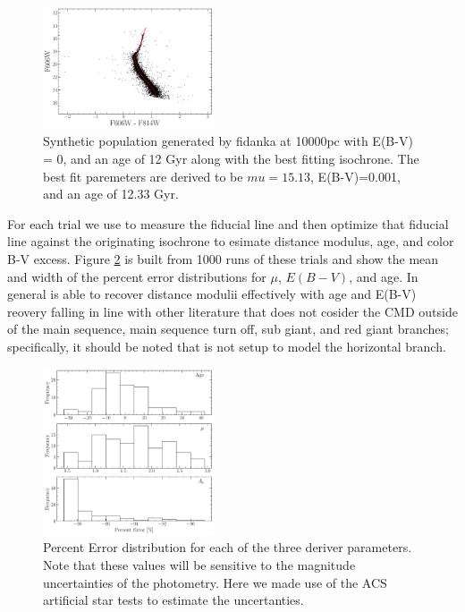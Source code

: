 \begin{figure}
  \centering
  \includegraphics[width=0.45\textwidth]{ExtractedIsoFit.pdf}
  \caption{Synthetic population generated by fidanka at 10000pc with E(B-V) =
  0, and an age of 12 Gyr along with the best fitting isochrone. The best fit
  paremeters are derived to be $mu=15.13$, E(B-V)=0.001, and an age of 12.33
  Gyr.}
  \label{fig:ValidationBestFit}
\end{figure}

For each trial we use \fidanka to measure the fiducial line and then optimize
that fiducial line against the originating isochrone to esimate distance
modulus, age, and color B-V excess. Figure \ref{fig:validationDist} is built
from 1000 runs of these trials and show the mean and width of the percent error
distributions for $\mu$, $E(B-V)$, and age. In general \fidanka is able to
recover distance modulii effectively with age and E(B-V) reovery falling in
line with other literature that does not cosider the CMD outside of the main
sequence, main sequence turn off, sub giant, and red giant branches;
specifically, it should be noted that \fidanka is not setup to model the
horizontal branch.

\begin{figure}
  \centering
  \includegraphics[width=0.45\textwidth]{DistributionOfErrors.pdf}
  \caption{Percent Error distribution for each of the three deriver parameters.
  Note that these values will be sensitive to the magnitude uncertainties of
  the photometry. Here we made use of the ACS artificial star tests to estimate
  the uncertanties.}
  \label{fig:validationDist}
\end{figure}
